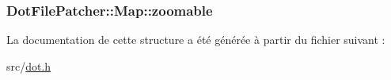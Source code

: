 \subsubsection[{zoomable}]{ Dot\+File\+Patcher\+::\+Map\+::zoomable}\label{struct_dot_file_patcher_1_1_map_a8e657340f36c6d423a2c0d1e417b3407}


La documentation de cette structure a été générée à partir du fichier suivant \+:\begin{DoxyCompactItemize}
\item 
src/\hyperlink{dot_8h}{dot.\+h}\end{DoxyCompactItemize}
